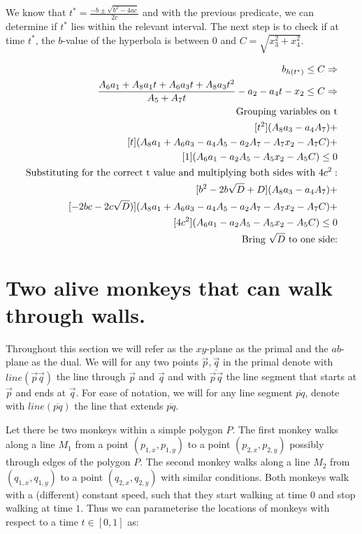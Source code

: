 \documentclass{article}
\begin{document}
We know that $t^* = \frac{-b \pm \sqrt{b^2 - 4ac}}{2c}$ and with the previous predicate, we can determine if $t^*$ lies within the relevant interval. The next step is to check if at time $t^*$, the $b$-value of the hyperbola is between $0$ and $C =\sqrt{x_3^2 + x_4^2}$.




\begin{align*}
     b_{h(t^*)} \le C \Rightarrow \\
\frac{ A_6 a_1 + A_8 a_1 t + A_6 a_3 t + A_8 a_3 t^2 }{A_5 + A_7t} - a_2 - a_4 t - x_2 \le C \Rightarrow \\
%
      \textnormal{Grouping variables on t} \\
[t^2](A_8 a_3-a_4 A_7) + \\
[t](A_8 a_1+ A_6 a_3 - a_4 A_5- a_2 A_7 - A_7x_2 - A_7 C) + \\
[1](A_6 a_1- a_2 A_5 - A_5 x_2 - A_5 C)   \le 0 \\
%
    \textnormal{Substituting for the correct t value and multiplying  both sides with } 4c^2:\\
[ b^2 - 2b\sqrt{D} + D](A_8 a_3-a_4 A_7) + \\
[-2bc -2c\sqrt{D})](A_8 a_1+ A_6 a_3 - a_4 A_5- a_2 A_7 - A_7x_2 - A_7 C) + \\
[4c^2](A_6 a_1- a_2 A_5 - A_5 x_2 - A_5 C) \le 0 \\
%
\textnormal{Bring } \sqrt{D} \textnormal{ to one side:} \\
\end{align*}





\section{Two alive monkeys that can walk through walls.}

Throughout this section we will refer as the $xy$-plane as the primal and the $ab$-plane as the dual. We will for any two points $\vec{p}, \vec{q}$ in the primal denote  with $line(\vec{p}\vec{q})$ the line through $\vec{p}$ and $\vec{q}$ and with $\overline{\vec{p}\vec{q}}$ the line segment that starts at $\vec{p}$ and ends at $\vec{q}$. For ease of notation, we will for any line segment $\overline{pq}$, denote with $line(\overline{pq})$ the line that extends $\overline{pq}$.

Let there be two monkeys within a simple polygon $P$. The first monkey walks along a line $M_1$ from a point $(p_{1,x}, p_{1,y})$ to a point $(p_{2,x}, p_{2,y})$ possibly through edges of the polygon $P$. The second monkey walks along a line $M_2$ from  $(q_{1,x}, q_{1,y})$ to a point $(q_{2,x}, q_{2,y})$ with similar conditions. Both monkeys walk with a (different) constant speed, such that they start  walking at time $0$ and stop walking at time $1$.  Thus we can parameterise the locations of monkeys with respect to a time $t \in [0,1]$ as: 
\end{document}
